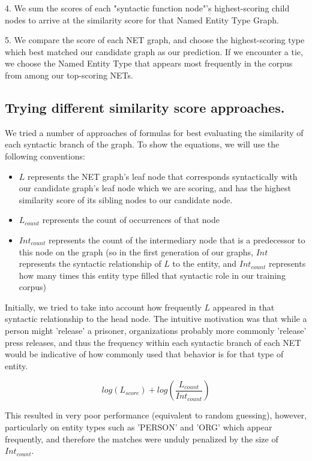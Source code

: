 \documentclass[11pt,a4paper]{article}
\begin{document}
4. We sum the scores of each "syntactic function node"'s highest-scoring child nodes to arrive at the similarity score for that Named Entity Type Graph.

5. We compare the score of each NET graph, and choose the highest-scoring type which best matched our candidate graph as our prediction. If we encounter a tie, we choose the Named Entity Type that appears most frequently in the corpus from among our top-scoring NETs.

\subsection{Trying different similarity score approaches.} \label{sim_scores}

We tried a number of approaches of formulas for best evaluating the similarity of each syntactic branch of the graph. To show the equations, we will use the following conventions:

\begin{itemize}
\item $L$ represents the NET graph's leaf node that corresponds syntactically with our candidate graph's leaf node which we are scoring, and has the highest similarity score of its sibling nodes to our candidate node.
\item $L_{count}$ represents the count of occurrences of that node
\item $Int_{count}$ represents the count of the intermediary node that is a predecessor to this node on the graph (so in the first generation of our graphs, $Int$ represents the syntactic relationship of $L$ to the entity, and $Int_{count}$ represents how many times this entity type filled that syntactic role in our training corpus)
\end{itemize}

Initially, we tried to take into account how frequently $L$ appeared in that syntactic relationship to the head node. The intuitive motivation was that while a person might 'release' a prisoner, organizations probably more commonly 'release' press releases, and thus the frequency within each syntactic branch of each NET would be indicative of how commonly used that behavior is for that type of entity.

$$ log(L_{score}) + log(\frac{L_{count}}{Int_{count}}) $$

This resulted in very poor performance (equivalent to random guessing), however, particularly on entity types such as 'PERSON' and 'ORG' which appear frequently, and therefore the matches were unduly penalized by the size of $Int_{count}$.
\end{document}
